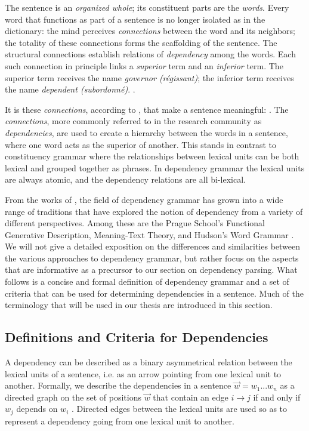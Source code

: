 \begin{displayquote}
The sentence is an \textit{organized whole}; its constituent parts are the \textit{words}. Every word that functions as part of a sentence is no longer isolated as in the dictionary: the mind perceives \textit{connections} between the word and its neighbors; the totality of these connections forms the scaffolding of the sentence. The structural connections establish relations of \textit{dependency} among the words. Each such connection in principle links a \textit{superior} term and an \textit{inferior} term. The superior term receives the name \textit{governor (r\'{e}gissant)}; the inferior term receives the name \textit{dependent (subordonn\'{e})}. \cite{Tes:15}.
\end{displayquote}

It is these \textit{connections}, according to \citeauthor{Tes:15}, that make a sentence meaningful:  \cite{Tes:15}. The \textit{connections}, more commonly referred to in the research community as \textit{dependencies}, are used to create a hierarchy between the words in a sentence, where one word acts as the superior of another. This stands in contrast to constituency grammar where the relationships between lexical units can be both lexical and grouped together as phrases. In dependency grammar the lexical units are always atomic, and the dependency relations are all bi-lexical. 

From the works of \citeauthor{Tes:15}, the field of dependency grammar has grown into a wide range of traditions that have explored the notion of dependency from a variety of different perspectives. Among these are the Prague School's Functional Generative Description, Meaning-Text Theory, and Hudson's Word Grammar \cite{Sgall:86, Mel:88, Hudson:90}. We will not give a detailed exposition on the differences and similarities between the various approaches to dependency grammar, but rather focus on the aspects that are informative as a precursor to our section on dependency parsing. What follows is a concise and formal definition of dependency grammar and a set of criteria that can be used for determining dependencies in a sentence. Much of the terminology that will be used in our thesis are introduced in this section.

\subsection{Definitions and Criteria for Dependencies}
\label{definitions}
A dependency can be described as a binary asymmetrical relation between the lexical units of a sentence, i.e. as an arrow pointing from one lexical unit to another. Formally, we describe the dependencies in a sentence $\vec{w} = w_1 ... w_n$ as a directed graph on the set of positions $\vec{w}$ that contain an edge $i \rightarrow j$ if and only if $w_j$ depends on $w_i$ \cite{Kuhl:10}. Directed edges between the lexical units are used so as to represent a dependency going from one lexical unit to another.

